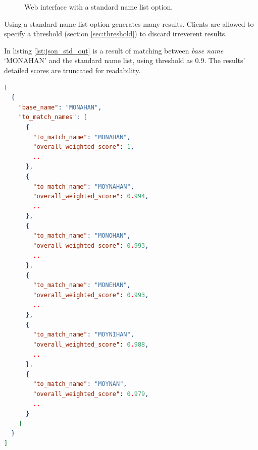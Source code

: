 \begin{figure}[H]
\centering
\captionsetup{justification=centering}
\caption{Web interface with a standard name list option.}
\label{fig:wi_std}
\end{figure}

Using a standard name list option generates many results.
Clients are allowed to specify a threshold (section \ref{sec:threshold})
to discard irreverent results.

In listing \ref{lst:json_std_out} is a result of matching between
\emph{base name} `MONAHAN' and the standard name list, using threshold as 0.9.
The results' detailed scores are truncated for readability.

\begin{minipage}{\linewidth}
  \begin{lstlisting}[language={json}, label={lst:json_std_out}, caption={Results of matching \emph{base name} `MONAHAN' with a standard name list.}]
[
  {
    "base_name": "MONAHAN",
    "to_match_names": [
      {
        "to_match_name": "MONAHAN",
        "overall_weighted_score": 1,
        ..
      },
      {
        "to_match_name": "MOYNAHAN",
        "overall_weighted_score": 0.994,
        ..
      },
      {
        "to_match_name": "MONOHAN",
        "overall_weighted_score": 0.993,
        ..
      },
      {
        "to_match_name": "MONEHAN",
        "overall_weighted_score": 0.993,
        ..
      },
      {
        "to_match_name": "MOYNIHAN",
        "overall_weighted_score": 0.988,
        ..
      },
      {
        "to_match_name": "MOYNAN",
        "overall_weighted_score": 0.979,
        ..
      }
    ]
  }
]
\end{lstlisting}
\end{minipage}

